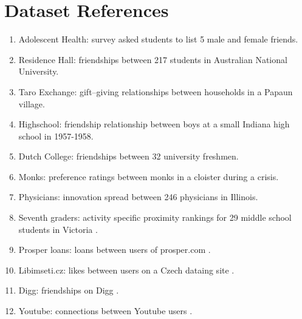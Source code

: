 \documentclass[3p,times]{elsarticle}
\begin{document}
\section{Dataset References}
\label{sec:dataset references}

\begin{enumerate}



    	\item Adolescent Health: survey asked students to list 5 male and female friends. \cite{AdHealth}

    	\item Residence Hall: friendships between 217 students in Australian National University. \cite{Res}

    	\item Taro Exchange: gift--giving relationships between households in a Papaun village. \cite{Taro}

    	\item Highschool: friendship relationship between boys at a small Indiana high school in 1957-1958. \cite{HS}

    	\item Dutch College: friendships between 32 university freshmen. \cite{Dutch}

    	\item Monks: preference ratings between monks in a cloister during a crisis. \cite{monks}

    	\item Physicians: innovation spread between 246 physicians in Illinois. \cite{docs}

    	\item Seventh graders: activity specific proximity rankings for 29 middle school students in Victoria \cite{sevies}.

    \item Prosper loans: loans between users of prosper.com \cite{prosper}.

    \item Libimseti.cz: likes between users on a Czech dataing site \cite{libi}.


    \item Digg: friendships on Digg \cite{digg}.

    \item Youtube: connections between Youtube users \cite{youtube}.


\end{enumerate}
\end{document}

